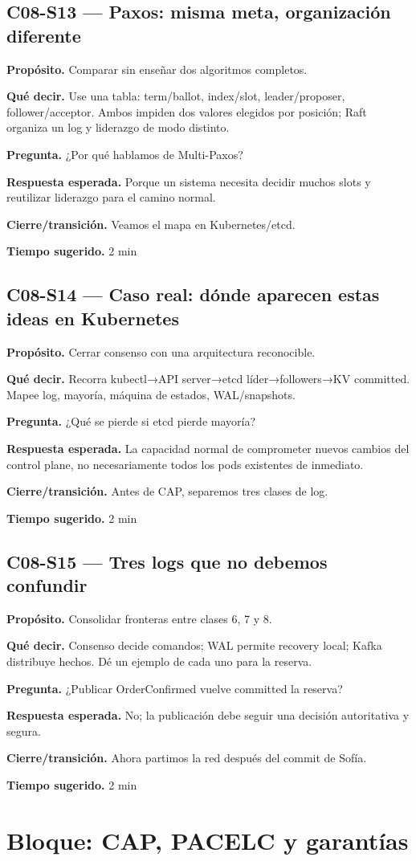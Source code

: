\documentclass[variant=docente,cover=institutional,mode=screen]{ua-engineering-v6-article}
\newcommand{\FrameField}[2]{\par\noindent\textbf{#1.} #2\par}
\begin{document}
\subsection*{C08-S13 --- Paxos: misma meta, organización diferente}
\FrameField{Propósito}{Comparar sin enseñar dos algoritmos completos.}
\FrameField{Qué decir}{Use una tabla: term/ballot, index/slot, leader/proposer, follower/acceptor. Ambos impiden dos valores elegidos por posición; Raft organiza un log y liderazgo de modo distinto.}
\FrameField{Pregunta}{¿Por qué hablamos de Multi-Paxos?}
\FrameField{Respuesta esperada}{Porque un sistema necesita decidir muchos slots y reutilizar liderazgo para el camino normal.}
\FrameField{Cierre/transición}{Veamos el mapa en Kubernetes/etcd.}
\FrameField{Tiempo sugerido}{2 min}

\subsection*{C08-S14 --- Caso real: dónde aparecen estas ideas en Kubernetes}
\FrameField{Propósito}{Cerrar consenso con una arquitectura reconocible.}
\FrameField{Qué decir}{Recorra kubectl→API server→etcd líder→followers→KV committed. Mapee log, mayoría, máquina de estados, WAL/snapshots.}
\FrameField{Pregunta}{¿Qué se pierde si etcd pierde mayoría?}
\FrameField{Respuesta esperada}{La capacidad normal de comprometer nuevos cambios del control plane, no necesariamente todos los pods existentes de inmediato.}
\FrameField{Cierre/transición}{Antes de CAP, separemos tres clases de log.}
\FrameField{Tiempo sugerido}{2 min}

\subsection*{C08-S15 --- Tres logs que no debemos confundir}
\FrameField{Propósito}{Consolidar fronteras entre clases 6, 7 y 8.}
\FrameField{Qué decir}{Consenso decide comandos; WAL permite recovery local; Kafka distribuye hechos. Dé un ejemplo de cada uno para la reserva.}
\FrameField{Pregunta}{¿Publicar OrderConfirmed vuelve committed la reserva?}
\FrameField{Respuesta esperada}{No; la publicación debe seguir una decisión autoritativa y segura.}
\FrameField{Cierre/transición}{Ahora partimos la red después del commit de Sofía.}
\FrameField{Tiempo sugerido}{2 min}

\section{Bloque: CAP, PACELC y garantías}
\end{document}
